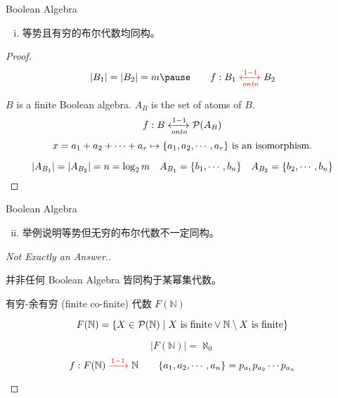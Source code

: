 \begin{frame}{}
  \begin{exampleblock}{Boolean Algebra}
    \begin{enumerate}[(i)]
      \item 等势且有穷的布尔代数均同构。 
    \end{enumerate}
  \end{exampleblock}

  \begin{proof}
    \pause
    \[
      |B_1| = |B_2| = m \pause \qquad f: B_1 \red{\;\xleftrightarrow[onto]{1-1}\;} B_2
    \]

    \pause
    \vspace{-0.50cm}
    \begin{theorem}
      $B$ is a finite Boolean algebra. $A_{B}$ is the set of atoms of $B$.
      \[
	f: B \xleftrightarrow[onto]{1-1} \mathcal{P}(A_B)  
      \]
      \[
	x = a_1 + a_2 + \cdots + a_r \mapsto \{a_1, a_2, \cdots, a_r\} \text{ is an isomorphism.}
      \]
    \end{theorem}
    \pause
    \vspace{-0.50cm}
    \[
      |A_{B_1}| = |A_{B_2}| = n = \log_2 m \quad A_{B_1} = \{b_1, \cdots, b_n\} \quad A_{B_2} = \{b_2, \cdots, b_n\} 
    \]
  \end{proof}
\end{frame}

\begin{frame}{}
  \begin{exampleblock}{Boolean Algebra}
    \begin{enumerate}[(i)]
      \setcounter{enumi}{1}
      \item 举例说明等势但无穷的布尔代数不一定同构。
    \end{enumerate}
  \end{exampleblock}

  \pause
  \vspace{0.60cm}
  \begin{proof}[Not Exactly an Answer.]
    \pause
    \begin{alertblock}{并非任何 Boolean Algebra 皆同构于某幂集代数。}
      \centerline{有穷-余有穷 (finite co-finite) 代数 $F(\mathbb{N})$}

      \[
	F(\mathbb{N}) = \{X \in \mathcal{P}(\mathbb{N}) \mid X \text{ is finite} \lor \mathbb{N} \setminus X \text{ is finite}\}
      \]

      \pause
      \[
	|F(\mathbb{N})| = \aleph_0
      \]
      \pause
      \[
	f: F(\mathbb{N}) \textcolor{red}{\;\xrightarrow{1-1}\;} \mathbb{N} \qquad \{a_1, a_2, \cdots, a_n\} = p_{a_1} p_{a_2} \cdots p_{a_n}
      \]
    \end{alertblock}
  \end{proof}
\end{frame}

